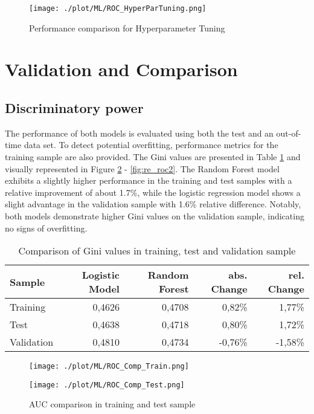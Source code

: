 \begin{figure}[H]
	\centering
	\texttt{[image: ./plot/ML/ROC\_HyperParTuning.png]}
    \caption{Performance comparison for Hyperparameter Tuning}
    \label{fig:re_rochp}
\end{figure}

\section{Validation and Comparison}
\label{sec:comp_model}

\subsection{Discriminatory power}
The performance of both models is evaluated using both the test and an out-of-time data set. To detect potential overfitting, performance metrics for the training sample are also provided. The Gini values are presented in Table \ref{re_ginicomp} and visually represented in Figure \ref{fig:re_roc1} - \ref{fig:re_roc2}. The Random Forest model exhibits a slightly higher performance in the training and test samples with a relative improvement of about 1.7\%, while the logistic regression model shows a slight advantage in the validation sample with 1.6\% relative difference. Notably, both models demonstrate higher Gini values on the validation sample, indicating no signs of overfitting.

\begin{table}[H]
\centering
\begin{tabular}{lrrrr}\toprule
\textbf{Sample} & \textbf{Logistic Model} & \textbf{Random Forest} & \textbf{abs. Change} & \textbf{rel. Change}\\\midrule
Training   & 0,4626 & 0,4708 & 0,82\%  & 1,77\%  \\
Test       & 0,4638 & 0,4718 & 0,80\%  & 1,72\%  \\
Validation & 0,4810 & 0,4734 & -0,76\% & -1,58\% \\\bottomrule
\end{tabular}
\caption{Comparison of Gini values in training, test and validation sample}
\label{re_ginicomp}
\end{table}

\begin{figure}[H]
\begin{minipage}{.5\textwidth}
	\centering
	\texttt{[image: ./plot/ML/ROC\_Comp\_Train.png]}
\end{minipage}%
\begin{minipage}{.5\textwidth}
	\centering
	\texttt{[image: ./plot/ML/ROC\_Comp\_Test.png]}
\end{minipage}
    \caption{AUC comparison in training and test sample}
    \label{fig:re_roc1}
\end{figure}

